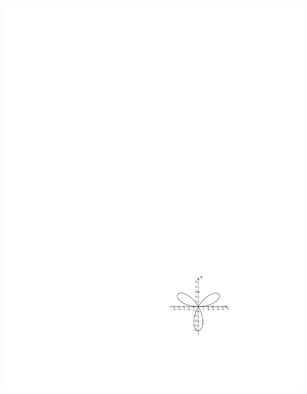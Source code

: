 \documentclass{ximera}
\begin{document}
\begin{exercise}
\begin{selectAll}
{\begin{image}
\includegraphics{WiaFgraphs1-6.pdf}
\end{image}
}
\end{selectAll}
\end{exercise}
\end{document}
